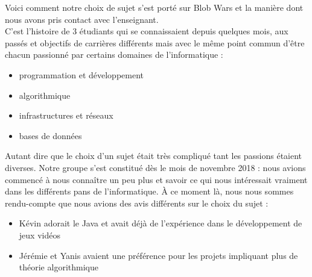 \documentclass[11pt,a4paper]{article}
\begin{document}
Voici comment notre choix de sujet s'est porté sur Blob Wars et la manière dont nous avons pris contact avec l'enseignant.\\

C'est l'histoire de 3 étudiants qui se connaissaient depuis quelques mois, aux passés et objectifs de carrières différents mais avec le même point commun d'être chacun passionné par certains domaines de l'informatique :
\begin{itemize}
    \item programmation et développement
    \item algorithmique
    \item infrastructures et réseaux
    \item bases de données
\end{itemize}

Autant dire que le choix d'un sujet était très compliqué tant les passions étaient diverses. Notre groupe s'est constitué dès le mois de novembre 2018 : nous avions commencé à nous connaître un peu plus et savoir ce qui nous intéressait vraiment dans les différents pans de l'informatique. À ce moment là, nous nous sommes rendu-compte que nous avions des avis différents sur le choix du sujet :
\begin{itemize}
    \item Kévin adorait le Java et avait déjà de l'expérience dans le développement de jeux vidéos
    \item Jérémie et Yanis avaient une préférence pour les projets impliquant plus de théorie algorithmique
\end{itemize}

\vspace{5px}
\end{document}
